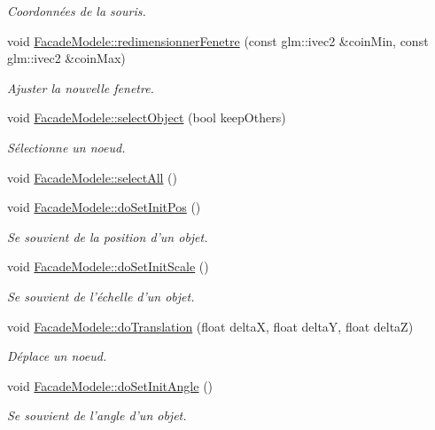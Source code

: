 \begin{DoxyCompactItemize}
\begin{DoxyCompactList}\small\item\em Coordonnées de la souris. \end{DoxyCompactList}\item 
void \hyperlink{group__inf2990_ga0a03742a7fa2215a6dd6de99cbfd7b05}{Facade\-Modele\-::redimensionner\-Fenetre} (const glm\-::ivec2 \&coin\-Min, const glm\-::ivec2 \&coin\-Max)
\begin{DoxyCompactList}\small\item\em Ajuster la nouvelle fenetre. \end{DoxyCompactList}\item 
void \hyperlink{group__inf2990_gaa1eea4eb52c6ec22980e0b21e2bdbcd4}{Facade\-Modele\-::select\-Object} (bool keep\-Others)
\begin{DoxyCompactList}\small\item\em Sélectionne un noeud. \end{DoxyCompactList}\item 
void \hyperlink{group__inf2990_ga91c3543726ad826767a5f1fdd42138f8}{Facade\-Modele\-::select\-All} ()
\item 
void \hyperlink{group__inf2990_gacbc609209644f410f7a576a8d1e509d0}{Facade\-Modele\-::do\-Set\-Init\-Pos} ()
\begin{DoxyCompactList}\small\item\em Se souvient de la position d'un objet. \end{DoxyCompactList}\item 
void \hyperlink{group__inf2990_gaccc885ec8fc20fa6709a2f74a609ce32}{Facade\-Modele\-::do\-Set\-Init\-Scale} ()
\begin{DoxyCompactList}\small\item\em Se souvient de l'échelle d'un objet. \end{DoxyCompactList}\item 
void \hyperlink{group__inf2990_ga3c29bb5fb742aacf7bea3f62357c4f48}{Facade\-Modele\-::do\-Translation} (float delta\-X, float delta\-Y, float delta\-Z)
\begin{DoxyCompactList}\small\item\em Déplace un noeud. \end{DoxyCompactList}\item 
void \hyperlink{group__inf2990_gadf7aee8a39d60a055bef3cd05cdda2db}{Facade\-Modele\-::do\-Set\-Init\-Angle} ()
\begin{DoxyCompactList}\small\item\em Se souvient de l'angle d'un objet. \end{DoxyCompactList}\item 

\end{DoxyCompactItemize}
